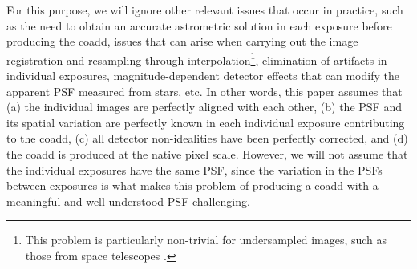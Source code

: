 \documentclass{aastex63}
\newcommand{\irresponse}[1]{{#1}}
\begin{document}
For this purpose, we will ignore other relevant issues that occur in practice, such as the need to obtain an accurate astrometric solution in each exposure before producing the coadd, issues that can arise when carrying out the image registration and resampling through interpolation\footnote{This problem is particularly non-trivial for undersampled images\irresponse{, such as those from space telescopes \citep[see discussion in][]{2011ApJ...741...46R}}.}, elimination of artifacts in individual exposures, magnitude-dependent detector effects that can modify the apparent PSF measured from stars, etc.  In other words, this paper assumes that (a) the individual images are perfectly aligned with each other, (b) the PSF and its spatial variation are perfectly known in each individual exposure contributing to the coadd, (c) all detector non-idealities have been perfectly corrected, and (d) the coadd is produced at the native pixel scale. 
However, we will not assume that the individual exposures have the same PSF, \irresponse{since the} variation in \irresponse{the} PSFs between exposures is what makes this problem of producing a coadd with a meaningful and well-understood PSF challenging. 
\end{document}
